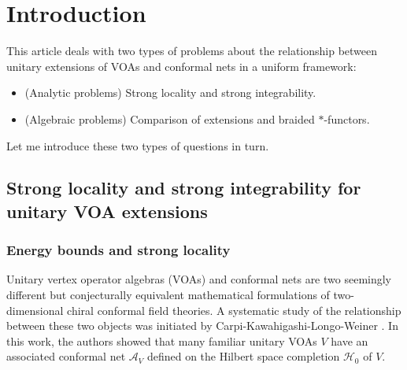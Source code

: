 \documentclass[11pt,b5paper,notitlepage]{article}
\theoremstyle{definition}
\theoremstyle{plain}
\newcommand{\mc}{\mathcal}
\numberwithin{equation}{section}
\begin{document}
\tableofcontents



	








\begin{comment}
\subsection{Declarations}
Conflict of interest: The author has no competing interests to declare that are relevant to the content of this article.
\end{comment}



\section{Introduction}


This article deals with two types of problems about the relationship between unitary extensions of VOAs and conformal nets in a uniform framework: 
\begin{itemize}
\item (Analytic problems) Strong locality and strong integrability.
\item (Algebraic problems) Comparison of extensions and braided $*$-functors.
\end{itemize}
Let me introduce these two types of questions in turn.

\subsection{Strong locality and strong integrability for unitary VOA extensions}

\subsubsection{Energy bounds and strong locality}

Unitary vertex operator algebras (VOAs) and conformal nets are two seemingly different but conjecturally equivalent mathematical formulations of two-dimensional chiral conformal field theories. A systematic study of the relationship between these two objects was initiated by Carpi-Kawahigashi-Longo-Weiner \cite{CKLW18}. In this work, the authors showed that many familiar unitary VOAs $V$ have an associated conformal net $\mc A_V$ defined on the Hilbert space completion $\mc H_0$ of $V$.
\end{document}
